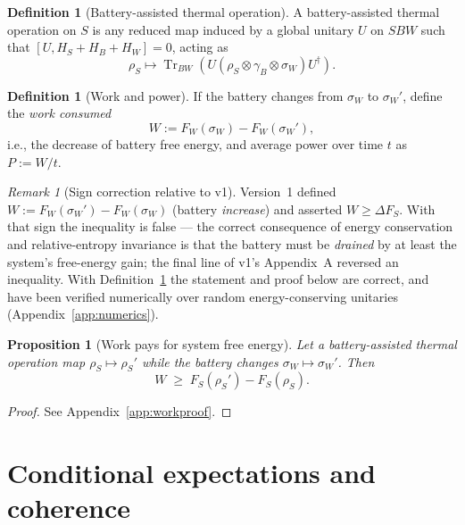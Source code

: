 \documentclass[11pt,a4paper]{article}
\theoremstyle{plain}
\newtheorem{proposition}[theorem]{Proposition}
\theoremstyle{definition}
\newtheorem{definition}[theorem]{Definition}
\theoremstyle{remark}
\newtheorem{remark}[theorem]{Remark}
\newcommand{\Tr}{\operatorname{Tr}}
\begin{document}
\begin{definition}[Battery-assisted thermal operation]\label{def:bato}
A battery-assisted thermal operation on $S$ is any reduced map induced by a
global unitary $U$ on $SBW$ such that $[U, H_S + H_B + H_W] = 0$, acting as
\begin{equation}
\rho_S \mapsto \Tr_{BW}\!\left(U(\rho_S \otimes \gamma_B \otimes \sigma_W)
U^\dagger\right).
\end{equation}
\end{definition}

\begin{definition}[Work and power]\label{def:work}
If the battery changes from $\sigma_W$ to $\sigma_W'$, define the \emph{work
consumed}
\begin{equation}
W := F_W(\sigma_W) - F_W(\sigma_W'),
\end{equation}
i.e., the decrease of battery free energy, and average power over time $t$ as
$P := W/t$.
\end{definition}

\begin{remark}[Sign correction relative to v1]\label{rem:sign}
Version~1 defined $W := F_W(\sigma_W') - F_W(\sigma_W)$ (battery
\emph{increase}) and asserted $W \ge \Delta F_S$. With that sign the inequality
is false --- the correct consequence of energy conservation and relative-entropy
invariance is that the battery must be \emph{drained} by at least the system's
free-energy gain; the final line of v1's Appendix~A reversed an inequality.
With Definition~\ref{def:work} the statement and proof below are correct, and
have been verified numerically over random energy-conserving unitaries
(Appendix~\ref{app:numerics}).
\end{remark}

\begin{proposition}[Work pays for system free energy]\label{prop:work}
Let a battery-assisted thermal operation map $\rho_S \mapsto \rho_S'$ while the
battery changes $\sigma_W \mapsto \sigma_W'$. Then
\begin{equation}
W \;\ge\; F_S(\rho_S') - F_S(\rho_S).
\end{equation}
\end{proposition}

\begin{proof}
See Appendix~\ref{app:workproof}.
\end{proof}

\section{Conditional expectations and coherence}
\end{document}
